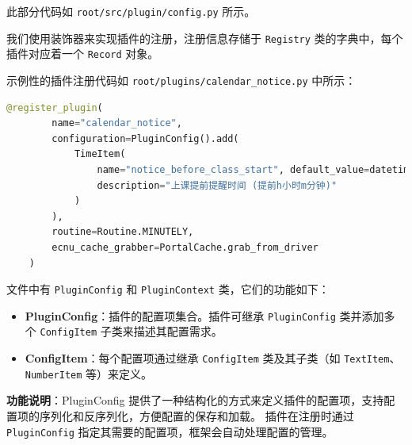 \documentclass[14pt,a4paper,UTF8,twoside]{article}
\begin{document}
    \begin{note}
        此部分代码如 \texttt{root/src/plugin/config.py} 所示。

        我们使用装饰器来实现插件的注册，注册信息存储于 \texttt{Registry} 类的字典中，每个插件对应着一个 \texttt{Record} 对象。
    \end{note}

    示例性的插件注册代码如 \texttt{root/plugins/calendar\_notice.py} 中所示：

    \begin{lstlisting}[language=python]
    @register_plugin(
        name="calendar_notice",
        configuration=PluginConfig().add(
            TimeItem(
                name="notice_before_class_start", default_value=datetime.time(0, 10),
                description="上课提前提醒时间 (提前h小时m分钟)"
            )
        ),
        routine=Routine.MINUTELY,
        ecnu_cache_grabber=PortalCache.grab_from_driver
    )
    \end{lstlisting}

    文件中有 \texttt{PluginConfig} 和 \texttt{PluginContext} 类，它们的功能如下：

    \begin{itemize}
        \item \textbf{PluginConfig}：插件的配置项集合。插件可继承 \texttt{PluginConfig} 类并添加多个 \texttt{ConfigItem} 子类来描述其配置需求。
        \item \textbf{ConfigItem}：每个配置项通过继承 \texttt{ConfigItem} 类及其子类（如 \texttt{TextItem}、\texttt{NumberItem} 等）来定义。
    \end{itemize}

    \textbf{功能说明}：PluginConfig 提供了一种结构化的方式来定义插件的配置项，支持配置项的序列化和反序列化，方便配置的保存和加载。
    插件在注册时通过 \texttt{PluginConfig} 指定其需要的配置项，框架会自动处理配置的管理。
\end{document}
